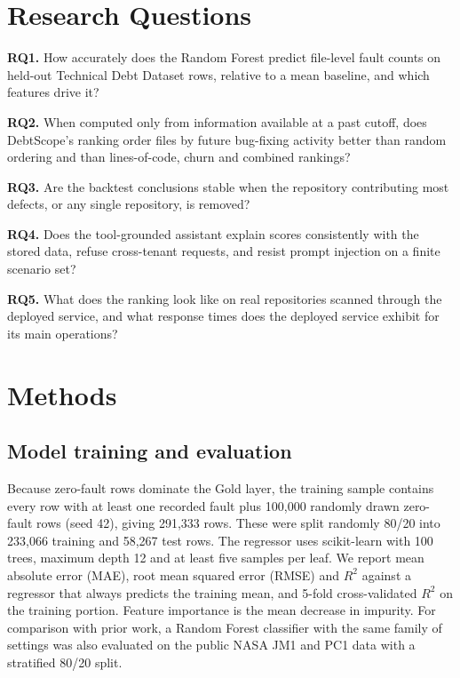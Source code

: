 \documentclass[conference]{IEEEtran}
\begin{document}
\section{Research Questions}
\textbf{RQ1.} How accurately does the Random Forest predict file-level fault counts on held-out Technical Debt Dataset rows, relative to a mean baseline, and which features drive it?

\textbf{RQ2.} When computed only from information available at a past cutoff, does DebtScope's ranking order files by future bug-fixing activity better than random ordering and than lines-of-code, churn and combined rankings?

\textbf{RQ3.} Are the backtest conclusions stable when the repository contributing most defects, or any single repository, is removed?

\textbf{RQ4.} Does the tool-grounded assistant explain scores consistently with the stored data, refuse cross-tenant requests, and resist prompt injection on a finite scenario set?

\textbf{RQ5.} What does the ranking look like on real repositories scanned through the deployed service, and what response times does the deployed service exhibit for its main operations?

\section{Methods}
\subsection{Model training and evaluation}
Because zero-fault rows dominate the Gold layer, the training sample contains every row with at least one recorded fault plus 100,000 randomly drawn zero-fault rows (seed 42), giving 291,333 rows. These were split randomly 80/20 into 233,066 training and 58,267 test rows. The regressor uses scikit-learn \cite{sklearn} with 100 trees, maximum depth 12 and at least five samples per leaf. We report mean absolute error (MAE), root mean squared error (RMSE) and $R^2$ against a regressor that always predicts the training mean, and 5-fold cross-validated $R^2$ on the training portion. Feature importance is the mean decrease in impurity. For comparison with prior work, a Random Forest classifier with the same family of settings was also evaluated on the public NASA JM1 and PC1 data \cite{menzies} with a stratified 80/20 split.
\end{document}
